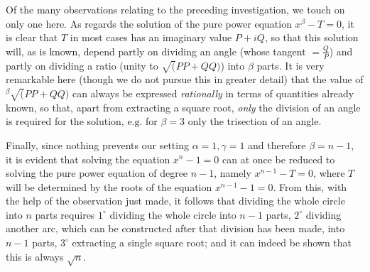 Of the many observations relating to the preceding investigation, we touch on only one here. As regards the solution of the pure power equation \(x^\beta-T=0\), it is clear that \(T\) in most cases has an imaginary value \(P+iQ\), so that this solution will, as is known, depend partly on dividing an angle (whose tangent \(=\frac QP\)) and partly on dividing a ratio (unity to \(\surd(PP+QQ)\)) into \(\beta\) parts. It is very remarkable here (though we do not pursue this in greater detail) that the value of \({}^{\beta}\!\surd(PP+QQ)\) can always be expressed \textit{rationally} in terms of quantities already known, so that, apart from extracting a square root, \textit{only} the division of an angle is required for the solution, \(\text{e.g.}\) for \(\beta=3\) only the trisection of an angle.

Finally, since nothing prevents our setting \(\alpha=1,\allowbreak \gamma=1\) and therefore
\(\beta=n-1\), it is evident that solving the equation \(x^n-1=0\) can at once be reduced to solving the pure power equation of degree \(n-1\), namely \(x^{n-1}-T=0\), where \(T\) will be determined by the roots of the equation \(x^{n-1}-1=0\). From this, with the help of the observation just made, it follows that dividing the whole circle into \(n\) parts requires \(1^\circ\) dividing the whole circle into \(n-1\) parts, \(2^\circ\) dividing another arc, which can be constructed after that division has been made, into \(n-1\) parts, \(3^\circ\) extracting a single square root; and it can indeed be shown that this is always \(\surd n\).
